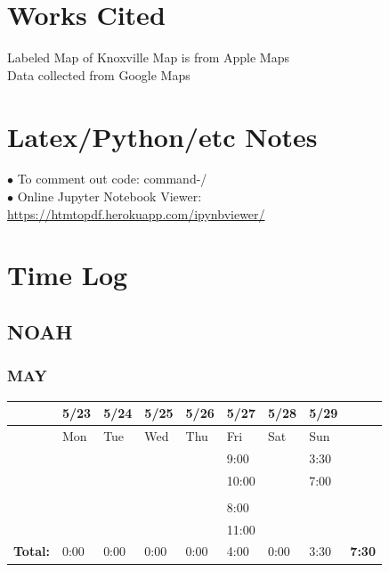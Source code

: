 \documentclass{article}
\begin{document}

\newpage
\section{Works Cited} 
Labeled Map of Knoxville Map is from Apple Maps \\
Data collected from Google Maps 

\newpage
\section{Latex/Python/etc Notes}
$\bullet$ To comment out code: command-/ \\
$\bullet$ Online Jupyter Notebook Viewer: \url{https://htmtopdf.herokuapp.com/ipynbviewer/}

\newpage
\section{Time Log}
\subsection{NOAH}
\subsubsection*{MAY}

\begin{tabular}{ |m{1cm}||m{1cm}|m{1cm}|m{1cm}|m{1cm}|m{1cm}|m{1cm}|m{1cm}||m{1cm}|} 
\hline
 & 5/23 & 5/24 & 5/25 & 5/26 & 5/27 & 5/28 & 5/29 & \\ 
\hline
\rowcolor{lightgray}
\cellcolor{white} & Mon & Tue & Wed & Thu & Fri & Sat & Sun & \cellcolor{white}\\ 
\hline
\hline
 & & & & & 9:00 & & 3:30 & \\ 
\hline
 & & & & & 10:00 & & 7:00 & \\ 
\hline
 & & & & & & & & \\ 
\hline
 & & & & & 8:00 & & & \\ 
\hline
 & & & & & 11:00 & & & \\ 
\hline
\textbf{Total:} & 0:00 & 0:00 & 0:00 & 0:00 & 4:00 & 0:00 & 3:30 & \textbf{7:30} \\
\hline
\end{tabular}
\flushleft
\end{document}
